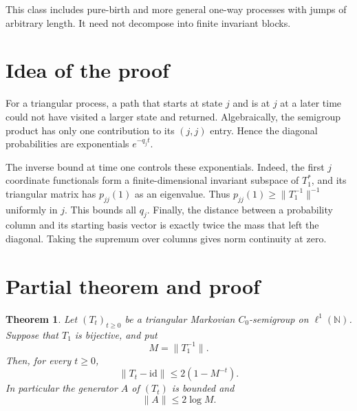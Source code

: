 \documentclass[11pt]{article}
\newtheorem{theorem}{Theorem}
\newcommand{\N}{\mathbb{N}}
\newcommand{\id}{\mathrm{id}}
\begin{document}
This class includes pure-birth and more general one-way processes with jumps
of arbitrary length. It need not decompose into finite invariant blocks.

\section{Idea of the proof}

For a triangular process, a path that starts at state $j$ and is at $j$ at a
later time could not have visited a larger state and returned. Algebraically,
the semigroup product has only one contribution to its $(j,j)$ entry. Hence
the diagonal probabilities are exponentials $e^{-q_jt}$.

The inverse bound at time one controls these exponentials. Indeed, the first
$j$ coordinate functionals form a finite-dimensional invariant subspace of
$T_1^*$, and its triangular matrix has $p_{jj}(1)$ as an eigenvalue. Thus
$p_{jj}(1)\ge\|T_1^{-1}\|^{-1}$ uniformly in $j$. This bounds all $q_j$.
Finally, the distance between a probability column and its starting basis
vector is exactly twice the mass that left the diagonal. Taking the supremum
over columns gives norm continuity at zero.

\section{Partial theorem and proof}

\begin{theorem}\label{thm:main}
Let $(T_t)_{t\ge0}$ be a triangular Markovian $C_0$-semigroup on
$\ell^1(\N)$. Suppose that $T_1$ is bijective, and put
\[
  M=\|T_1^{-1}\|.
\]
Then, for every $t\ge0$,
\begin{equation}\label{eq:normbound}
  \|T_t-\id\|\le 2(1-M^{-t}).
\end{equation}
In particular the generator $A$ of $(T_t)$ is bounded and
\begin{equation}\label{eq:generatorbound}
  \|A\|\le2\log M.
\end{equation}
\end{theorem}
\end{document}
